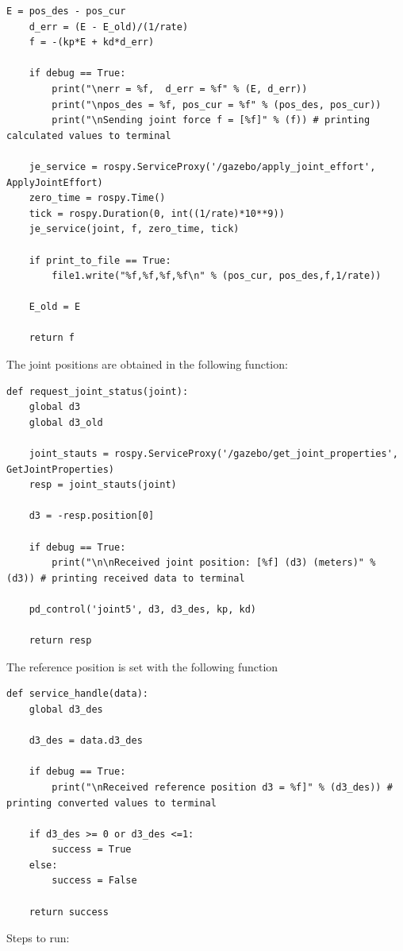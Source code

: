 \documentclass[10pt]{article}
\begin{document}
\begin{enumerate}
\begin{lstlisting}[style=Matlab-editor,basicstyle=\mlttfamily,escapechar=`]
	E = pos_des - pos_cur
	d_err = (E - E_old)/(1/rate)
	f = -(kp*E + kd*d_err)
	
	if debug == True:
		print("\nerr = %f,  d_err = %f" % (E, d_err))
		print("\npos_des = %f, pos_cur = %f" % (pos_des, pos_cur))
		print("\nSending joint force f = [%f]" % (f)) # printing calculated values to terminal
	
	je_service = rospy.ServiceProxy('/gazebo/apply_joint_effort', ApplyJointEffort)
	zero_time = rospy.Time()
	tick = rospy.Duration(0, int((1/rate)*10**9))
	je_service(joint, f, zero_time, tick)
	
	if print_to_file == True:
		file1.write("%f,%f,%f,%f\n" % (pos_cur, pos_des,f,1/rate))
	
	E_old = E 
	
	return f
\end{lstlisting} 

	The joint positions are obtained in the following function:
	
\begin{lstlisting}[style=Matlab-editor,basicstyle=\mlttfamily,escapechar=`]
def request_joint_status(joint):
	global d3
	global d3_old
	
	joint_stauts = rospy.ServiceProxy('/gazebo/get_joint_properties', GetJointProperties)
	resp = joint_stauts(joint)
	
	d3 = -resp.position[0]
	
	if debug == True:
		print("\n\nReceived joint position: [%f] (d3) (meters)" % (d3)) # printing received data to terminal
	
	pd_control('joint5', d3, d3_des, kp, kd)
	
	return resp
\end{lstlisting} 

	The reference position is set with the following function
	
\begin{lstlisting}[style=Matlab-editor,basicstyle=\mlttfamily,escapechar=`]
def service_handle(data):
	global d3_des
	
	d3_des = data.d3_des
	
	if debug == True:
		print("\nReceived reference position d3 = %f]" % (d3_des)) # printing converted values to terminal
	
	if d3_des >= 0 or d3_des <=1:
		success = True
	else:
		success = False
	
	return success
\end{lstlisting} 

	Steps to run:
	

\end{enumerate}
\end{document}
